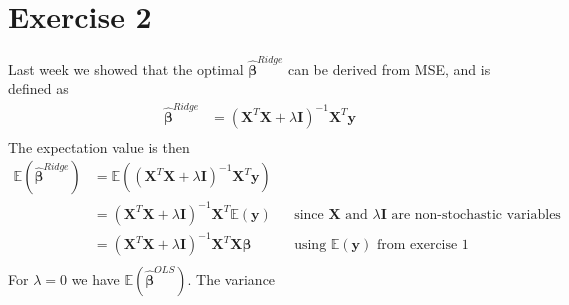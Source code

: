 \documentclass[english,notitlepage]{revtex4-1}
\begin{document}
\section*{Exercise 2}
Last week we showed that the optimal $\boldsymbol{\hat{\beta}}^{Ridge}$ can be derived from MSE, and is defined as 
\begin{align*}
    \boldsymbol{\hat{\beta}}^{Ridge} &= (\boldsymbol{X}^{T}\boldsymbol{X} + \lambda \boldsymbol{I})^{-1} \boldsymbol{X}^{T} \boldsymbol{y} \\
\end{align*}
The expectation value is then 
\begin{align*}
    \mathbb{E} (\boldsymbol{\hat{\beta}}^{Ridge}) &= \mathbb{E}((\boldsymbol{X}^{T}\boldsymbol{X} + \lambda \boldsymbol{I})^{-1} \boldsymbol{X}^{T} \boldsymbol{y}) \\
    &= (\boldsymbol{X}^{T}\boldsymbol{X} + \lambda \boldsymbol{I})^{-1} \boldsymbol{X}^{T} \mathbb{E}( \boldsymbol{y} ) && \text{since $\boldsymbol{X}$ and $\lambda \boldsymbol{I}$ are non-stochastic variables} \\
    &= (\boldsymbol{X}^{T}\boldsymbol{X} + \lambda \boldsymbol{I})^{-1} \boldsymbol{X}^{T} \boldsymbol{X} \boldsymbol{\beta} && \text{using $\mathbb{E} (\boldsymbol{y})$ from exercise 1} \\
\end{align*}
For $\lambda = 0$ we have $\mathbb{E} (\boldsymbol{\hat{\beta}}^{OLS})$. The variance 
\end{document}
